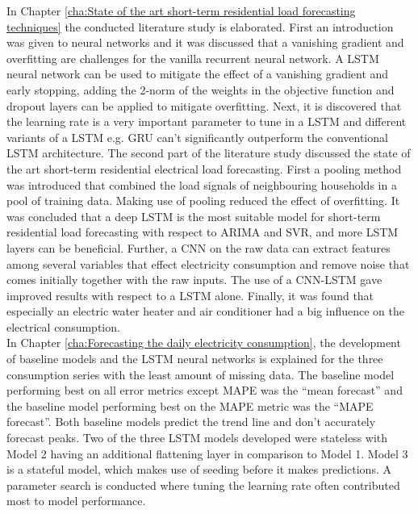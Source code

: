 In Chapter \ref{cha:State of the art short-term residential load forecasting techniques} the conducted literature study is elaborated. First an introduction was given to neural networks and it was discussed that a vanishing gradient and overfitting are challenges for the vanilla recurrent neural network. A LSTM neural network can be used to mitigate the effect of a vanishing gradient and early stopping, adding the 2-norm of the weights in the objective function and dropout layers can be applied to mitigate overfitting. Next, it is discovered that the learning rate is a very important parameter to tune in a LSTM and different variants of a LSTM e.g. GRU can't significantly outperform the conventional LSTM architecture. The second part of the literature study discussed the state of the art short-term residential electrical load forecasting. First a pooling method was introduced that combined the load signals of neighbouring households in a pool of training data. Making use of pooling reduced the effect of overfitting. It was concluded that a deep LSTM is the most suitable model for short-term residential load forecasting with respect to ARIMA and SVR, and more LSTM layers can be beneficial. Further, a CNN on the raw data can extract features among several variables that effect electricity consumption and remove noise that comes initially together with the raw inputs. The use of a CNN-LSTM gave improved results with respect to a LSTM alone. Finally, it was found that especially an electric water heater and air conditioner had a big influence on the electrical consumption.\\

In Chapter \ref{cha:Forecasting the daily electricity consumption}, the development of baseline models and the LSTM neural networks is explained for the three consumption series with the least amount of missing data. The baseline model performing best on all error metrics except MAPE was the ``mean forecast'' and the baseline model performing best on the MAPE metric was the ``MAPE forecast''. Both baseline models predict the trend line and don't accurately forecast peaks. Two of the three LSTM models developed were stateless with Model 2 having an additional flattening layer in comparison to Model 1. Model 3 is a stateful model, which makes use of seeding before it makes predictions. A parameter search is conducted where tuning the learning rate often contributed most to model performance.\\

